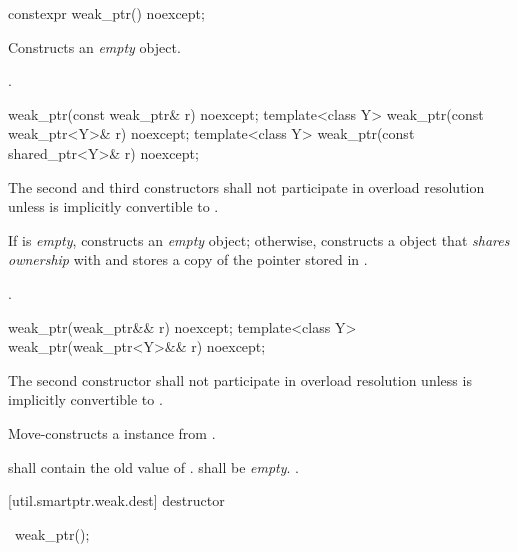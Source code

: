 %
\begin{itemdecl}
constexpr weak_ptr() noexcept;
\end{itemdecl}

\begin{itemdescr}
\pnum\effects  Constructs an \textit{empty}  object.

\pnum\postconditions  {}.
\end{itemdescr}

%
\begin{itemdecl}
weak_ptr(const weak_ptr& r) noexcept;
template<class Y> weak_ptr(const weak_ptr<Y>& r) noexcept;
template<class Y> weak_ptr(const shared_ptr<Y>& r) noexcept;
\end{itemdecl}

\begin{itemdescr}
\pnum\remark The second and third constructors shall not participate in
overload resolution unless  is implicitly convertible to .

\pnum\effects  If  is \textit{empty}, constructs
an \textit{empty}  object; otherwise, constructs
a  object that \textit{shares ownership}
with  and stores a copy of the pointer stored in .

\pnum\postconditions  {}.
\end{itemdescr}

%
\begin{itemdecl}
weak_ptr(weak_ptr&& r) noexcept;
template<class Y> weak_ptr(weak_ptr<Y>&& r) noexcept;
\end{itemdecl}

\begin{itemdescr}
\pnum\remark The second constructor shall not participate in overload resolution unless
 is implicitly convertible to .

\pnum\effects Move-constructs a  instance from .

\pnum\postconditions {} shall contain the old value of .
 shall be \textit{empty}. .
\end{itemdescr}

[util.smartptr.weak.dest]{ destructor}

%
\begin{itemdecl}
~weak_ptr();
\end{itemdecl}

